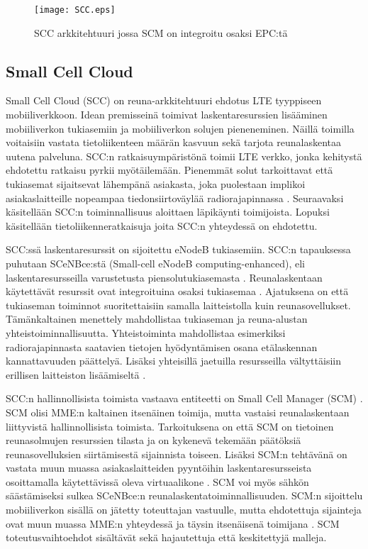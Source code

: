 \begin{figure}[tb]
\texttt{[image: SCC.eps]}
\caption{SCC arkkitehtuuri jossa SCM on integroitu osaksi EPC:tä} \label{fig:scc}
\end{figure}

\subsection{Small Cell Cloud} \label{scc}

Small Cell Cloud (SCC) on reuna-arkkitehtuuri ehdotus LTE tyyppiseen mobiiliverkkoon.
Idean premisseinä toimivat laskentaresurssien lisääminen mobiiliverkon tukiasemiin ja mobiiliverkon solujen pieneneminen.
Näillä toimilla voitaisiin vastata tietoliikenteen määrän kasvuun sekä tarjota reunalaskentaa uutena palveluna.
SCC:n ratkaisuympäristönä toimii LTE verkko, jonka kehitystä ehdotettu ratkaisu pyrkii myötäilemään.
Pienemmät solut tarkoittavat että tukiasemat sijaitsevat lähempänä asiakasta, joka puolestaan implikoi asiakaslaitteille nopeampaa tiedonsiirtoväylää radiorajapinnassa \cite{lobillo15scc}.
Seuraavaksi käsitellään SCC:n toiminnallisuus aloittaen läpikäynti toimijoista. Lopuksi käsitellään tietoliikenneratkaisuja joita SCC:n yhteydessä on ehdotettu.

SCC:ssä laskentaresurssit on sijoitettu eNodeB tukiasemiin. SCC:n tapauksessa puhutaan SCeNBce:stä (Small-cell eNodeB computing-enhanced), eli laskentaresursseilla varustetusta piensolutukiasemasta \cite{lobillo15scc}.
Reunalaskentaan käytettävät resurssit ovat integroituina osaksi tukiasemaa \cite{puente15seamless}.
Ajatuksena on että tukiaseman toiminnot suoritettaisiin samalla laitteistolla kuin reunasovellukset.
Tämänkaltainen menettely mahdollistaa tukiaseman ja reuna-alustan yhteistoiminnallisuutta.
Yhteistoiminta mahdollistaa esimerkiksi radiorajapinnasta saatavien tietojen hyödyntämisen osana etälaskennan kannattavuuden päättelyä.
Lisäksi yhteisillä jaetuilla resursseilla vältyttäisiin erillisen laitteiston lisäämiseltä \cite{puente15seamless}.

SCC:n hallinnollisista toimista vastaava entiteetti on Small Cell Manager (SCM) \cite{lobillo15scc}.
SCM olisi MME:n kaltainen itsenäinen toimija, mutta vastaisi reunalaskentaan liittyvistä hallinnollisista toimista.
Tarkoituksena on että SCM on tietoinen reunasolmujen resurssien tilasta ja on kykenevä tekemään päätöksiä reunasovelluksien siirtämisestä sijainnista toiseen. 
Lisäksi SCM:n tehtävänä on vastata muun muassa asiakaslaitteiden pyyntöihin laskentaresursseista osoittamalla käytettävissä oleva virtuaalikone \cite{dolezal2016performance}.
SCM voi myös sähkön säästämiseksi sulkea SCeNBce:n reunalaskentatoiminnallisuuden.
SCM:n sijoittelu mobiiliverkon sisällä on jätetty toteuttajan vastuulle, mutta ehdotettuja sijainteja ovat muun muassa MME:n yhteydessä ja täysin itsenäisenä toimijana \cite{lobillo15scc}.
SCM toteutusvaihtoehdot sisältävät sekä hajautettuja että keskitettyjä malleja.

